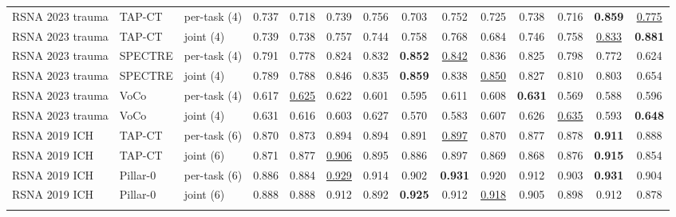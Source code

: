 \begin{tabular}{lllccccccccccc}
\addlinespace[2pt]
RSNA 2023 trauma & TAP-CT & per-task (4) & 0.737 & 0.718 & 0.739 & \cellcolor{modebest}0.756 & 0.703 & 0.752 & \cellcolor{modebest}0.725 & 0.738 & 0.716 & \cellcolor{modebest}\textbf{0.859} & \underline{0.775} \\
RSNA 2023 trauma & TAP-CT & joint (4) & \cellcolor{modebest}0.739 & \cellcolor{modebest}0.738 & \cellcolor{modebest}0.757 & 0.744 & \cellcolor{modebest}0.758 & \cellcolor{modebest}0.768 & 0.684 & \cellcolor{modebest}0.746 & \cellcolor{modebest}0.758 & \underline{0.833} & \cellcolor{modebest}\textbf{0.881} \\
\addlinespace[2pt]
RSNA 2023 trauma & SPECTRE & per-task (4) & \cellcolor{modebest}0.791 & 0.778 & 0.824 & 0.832 & \textbf{0.852} & \cellcolor{modebest}\underline{0.842} & 0.836 & 0.825 & 0.798 & 0.772 & 0.624 \\
RSNA 2023 trauma & SPECTRE & joint (4) & 0.789 & \cellcolor{modebest}0.788 & \cellcolor{modebest}0.846 & \cellcolor{modebest}0.835 & \cellcolor{modebest}\textbf{0.859} & 0.838 & \cellcolor{modebest}\underline{0.850} & \cellcolor{modebest}0.827 & \cellcolor{modebest}0.810 & \cellcolor{modebest}0.803 & \cellcolor{modebest}0.654 \\
\addlinespace[2pt]
RSNA 2023 trauma & VoCo & per-task (4) & 0.617 & \cellcolor{modebest}\underline{0.625} & \cellcolor{modebest}0.622 & 0.601 & \cellcolor{modebest}0.595 & \cellcolor{modebest}0.611 & \cellcolor{modebest}0.608 & \cellcolor{modebest}\textbf{0.631} & 0.569 & 0.588 & 0.596 \\
RSNA 2023 trauma & VoCo & joint (4) & \cellcolor{modebest}0.631 & 0.616 & 0.603 & \cellcolor{modebest}0.627 & 0.570 & 0.583 & 0.607 & 0.626 & \cellcolor{modebest}\underline{0.635} & \cellcolor{modebest}0.593 & \cellcolor{modebest}\textbf{0.648} \\
\addlinespace[2pt]
RSNA 2019 ICH & TAP-CT & per-task (6) & 0.870 & 0.873 & 0.894 & 0.894 & \cellcolor{modebest}0.891 & \underline{0.897} & \cellcolor{modebest}0.870 & \cellcolor{modebest}0.877 & \cellcolor{modebest}0.878 & \textbf{0.911} & \cellcolor{modebest}0.888 \\
RSNA 2019 ICH & TAP-CT & joint (6) & \cellcolor{modebest}0.871 & \cellcolor{modebest}0.877 & \cellcolor{modebest}\underline{0.906} & \cellcolor{modebest}0.895 & 0.886 & 0.897 & 0.869 & 0.868 & 0.876 & \cellcolor{modebest}\textbf{0.915} & 0.854 \\
\addlinespace[2pt]
RSNA 2019 ICH & Pillar-0 & per-task (6) & 0.886 & 0.884 & \cellcolor{modebest}\underline{0.929} & \cellcolor{modebest}0.914 & 0.902 & \cellcolor{modebest}\textbf{0.931} & \cellcolor{modebest}0.920 & \cellcolor{modebest}0.912 & \cellcolor{modebest}0.903 & \cellcolor{modebest}\textbf{0.931} & \cellcolor{modebest}0.904 \\
RSNA 2019 ICH & Pillar-0 & joint (6) & \cellcolor{modebest}0.888 & \cellcolor{modebest}0.888 & 0.912 & 0.892 & \cellcolor{modebest}\textbf{0.925} & 0.912 & \underline{0.918} & 0.905 & 0.898 & 0.912 & 0.878 \\
\addlinespace[2pt]
\bottomrule
\end{tabular}
